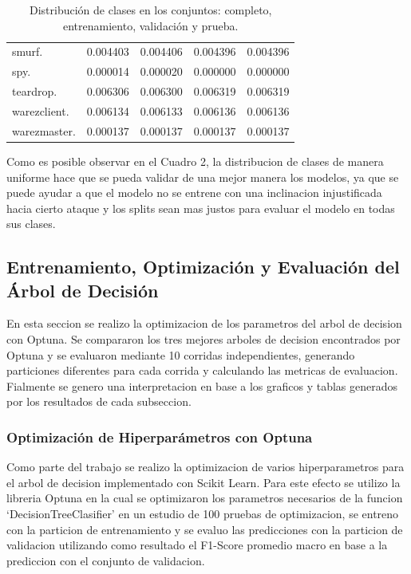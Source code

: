 \documentclass[12pt,a4paper]{article}
\begin{document}
\begin{table}[h!]
{\begin{tabular}{lrrrr}
      smurf.            & 0.004403 & 0.004406 & 0.004396 & 0.004396 \\
      spy.              & 0.000014 & 0.000020 & 0.000000 & 0.000000 \\
      teardrop.         & 0.006306 & 0.006300 & 0.006319 & 0.006319 \\
      warezclient.      & 0.006134 & 0.006133 & 0.006136 & 0.006136 \\
      warezmaster.      & 0.000137 & 0.000137 & 0.000137 & 0.000137 \\
      \hline
    \end{tabular}
  }
  \caption{Distribución de clases en los conjuntos: completo, entrenamiento, validación y prueba.}
  \label{tab:dist_all}
\end{table}

Como es posible observar en el Cuadro 2, la distribucion de clases de manera uniforme hace que se pueda
validar de una mejor manera los modelos, ya que se puede ayudar a que el modelo no se entrene
con una inclinacion injustificada hacia cierto ataque y los splits sean mas justos para evaluar el modelo en todas
sus clases.

\subsection{Entrenamiento, Optimización y Evaluación del Árbol de Decisión}

En esta seccion se realizo la optimizacion de los parametros del arbol de decision con Optuna.
Se compararon los tres mejores arboles de decision encontrados por Optuna y se evaluaron mediante 10 corridas independientes,
generando particiones diferentes para cada corrida y calculando las metricas de evaluacion. Fialmente se genero
una interpretacion en base a los graficos y tablas generados por los resultados de cada subseccion.

\subsubsection{Optimización de Hiperparámetros con Optuna}

Como parte del trabajo se realizo la optimizacion de varios hiperparametros para el arbol de decision implementado con Scikit Learn.
Para este efecto se utilizo la libreria Optuna en la cual se optimizaron los parametros necesarios de la funcion `DecisionTreeClasifier' en
un estudio de 100 pruebas de optimizacion, se entreno con la particion de entrenamiento y se evaluo las predicciones con la particion de validacion
utilizando como resultado el F1-Score promedio macro en base a la prediccion con el conjunto de validacion.
\end{document}
